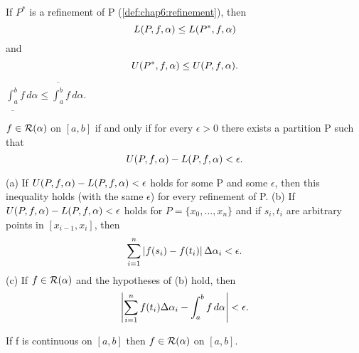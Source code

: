 \begin{theorem} %
  \label{thm:chap6:refinement_sums}
  If $P^*$ is a refinement of P (\autoref{def:chap6:refinement}), then
  \[ L(P, f, \alpha) \le L(P^*, f, \alpha) \]
  and
  \[ U(P^*, f, \alpha) \le U(P, f, \alpha). \]
\end{theorem}

\begin{theorem}[Lower Integral <= Upper Integral] %
  \label{thm:chap6:lower_le_upper_integral}
  $\underline{\int_a^b} f \, d\alpha \le \overline{\int_a^b} f \, d\alpha$.
\end{theorem}

\begin{theorem} %
  \label{thm:chap6:integrability_condition}
  $f \in \mathcal{R}(\alpha)$ on $[a, b]$ if and only if for every
  $\epsilon > 0$ there exists a partition P such that
  \[ U(P, f, \alpha) - L(P, f, \alpha) < \epsilon. \]
\end{theorem}



\begin{theorem} %
  \label{thm:chap6:integrability_props}
  (a) If $U(P, f, \alpha) - L(P, f, \alpha) < \epsilon$ holds
  for some P and some $\epsilon$, then this inequality holds (with
  the same $\epsilon$) for every refinement of P.
  (b) If $U(P, f, \alpha) - L(P, f, \alpha) < \epsilon$ holds
  for $P=\{x_0, \dots, x_n\}$ and if $s_i, t_i$ are arbitrary points
  in $[x_{i-1}, x_i]$, then
  \[ \sum_{i=1}^n \left\lvert f(s_i) - f(t_i) \right\rvert \Delta \alpha_i < \epsilon. \]
  (c) If $f \in \mathcal{R}(\alpha)$ and the hypotheses of (b) hold, then
  \[ \left\lvert \sum_{i=1}^n f(t_i) \Delta \alpha_i - \int_a^b f \,
  d\alpha \right\rvert < \epsilon. \]
\end{theorem}

\begin{theorem} %
  \label{thm:chap6:continuous_implies_integrable}
  If f is continuous on $[a, b]$ then $f \in \mathcal{R}(\alpha)$ on $[a, b]$.
\end{theorem}

